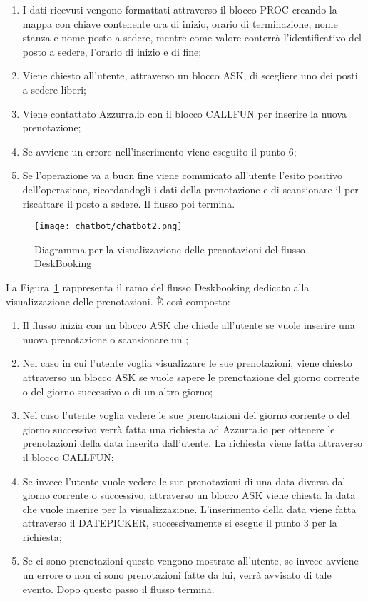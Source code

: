 \begin{enumerate}
	\item I dati ricevuti vengono formattati attraverso il blocco PROC creando la mappa con chiave contenente ora di inizio, orario di terminazione, nome stanza e nome posto a sedere, mentre come valore conterrà l'identificativo del posto a sedere, l'orario di inizio e di fine;
	\item Viene chiesto all'utente, attraverso un blocco ASK, di scegliere uno dei posti a sedere liberi;
	\item Viene contattato Azzurra.io con il blocco CALLFUN per inserire la nuova prenotazione;
	\item Se avviene un errore nell'inserimento viene eseguito il punto 6;
	\item Se l'operazione va a buon fine viene comunicato all'utente l'esito positivo dell'operazione, ricordandogli i dati della prenotazione e di scansionare il  per riscattare il posto a sedere. Il flusso poi termina.
\end{enumerate}

\begin{figure}[h]
	\centering
	\texttt{[image: chatbot/chatbot2.png]}
	\caption{Diagramma per la visualizzazione delle prenotazioni del flusso DeskBooking}\label{fig:vis}
\end{figure}

La Figura~\ref{fig:vis} rappresenta il ramo del flusso Deskbooking dedicato alla visualizzazione delle prenotazioni. È così composto:
\begin{enumerate}
	\item Il flusso inizia con un blocco ASK che chiede all'utente se vuole inserire una nuova prenotazione o scansionare un ;
	\item Nel caso in cui l'utente voglia visualizzare le sue prenotazioni, viene chiesto attraverso un blocco ASK se vuole sapere le prenotazione del giorno corrente o del giorno successivo o di un altro giorno;
	\item Nel caso l'utente voglia vedere le sue prenotazioni del giorno corrente o del giorno successivo verrà fatta una richiesta ad Azzurra.io per ottenere le prenotazioni della data inserita dall'utente. La richiesta viene fatta attraverso il blocco CALLFUN;
	\item Se invece l'utente vuole vedere le sue prenotazioni di una data diversa dal giorno corrente o successivo, attraverso un blocco ASK viene chiesta la data che vuole inserire per la visualizzazione. L'inserimento della data viene fatta attraverso il DATEPICKER, successivamente si esegue il punto 3 per la richiesta;
	\item Se ci sono prenotazioni queste vengono mostrate all'utente, se invece avviene un errore o non ci sono prenotazioni fatte da lui, verrà avvisato di tale evento. Dopo questo passo il flusso termina.\\
\end{enumerate}

